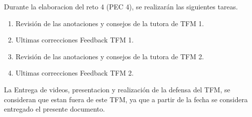 \noindent Durante la elaboracion del reto 4  (PEC 4), se realizarán las siguientes tareas.

\begin{enumerate}
    \item Revisión de las anotaciones y consejos de la tutora de TFM 1.
    \item Ultimas correcciones Feedback TFM 1.
    \item Revisión de las anotaciones y consejos de la tutora de TFM 2.
    \item Ultimas correcciones Feedback TFM 2.
\end{enumerate}

\noindent La Entrega de videos, presentacion y realización de la defensa del TFM, se consideran que estan fuera de este TFM, ya que a partir de la fecha se considera entregado el presente documento.
